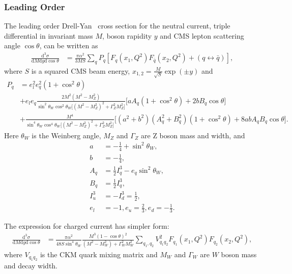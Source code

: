 \documentclass[11pt,a4paper]{article}
\begin{document}
\subsubsection{Leading Order}
The leading order Drell-Yan~\cite{Drell:1970wh,Yamada:1981mw} cross section 
for the neutral current, triple differential in
invariant mass \(M\), boson rapidity \(y\) and CMS
lepton scattering angle \(\cos\theta\), can be written as
\begin{align}
\frac{\mathrm{d}^3\sigma}{\mathrm{d}M\mathrm{d}y\mathrm{d}\cos\theta} &=
  \frac{\pi\alpha^2}{3MS}\sum_{q}P_q
  \left[F_q(x_1,Q^2)F_{\bar{q}}(x_2,Q^2) + (q\leftrightarrow\bar{q})\right],
\end{align}
where \(S\) is a squared CMS beam energy, \(x_{1,2} = \frac{M}{\sqrt{S}}\exp(\pm y)\) and 
\begin{align}
  P_q &=  e_l^2e_q^2(1+\cos^2\theta) \nonumber \\
      &+  e_le_q\frac{2M^2(M^2-M_Z^2)}{\sin^2\theta_W\cos^2\theta_W
          \big[(M^2-M_Z^2)^2+\Gamma_Z^2M_Z^2\big]}
          \big[aA_q(1+\cos^2\theta)+2bB_q\cos\theta\big] \nonumber \\
      &+  \frac{M^4}{\sin^4\theta_W\cos^4\theta_W
          \big[(M^2-M_Z^2)^2+\Gamma_Z^2M_Z^2\big]}
          \big[(a^2+b^2)(A_q^2+B_q^2)(1+\cos^2\theta)+8abA_qB_q\cos\theta\big].
\end{align}
Here \(\theta_W\) is the Weinberg angle, \(M_Z\) and \(\Gamma_Z\) are Z boson mass and 
width, and
\begin{align}
 a & = -\frac{1}{4} + \sin^2\theta_W,  \nonumber \\
 b & = -\frac{1}{4},  \nonumber \\
 A_q & = \frac{1}{2}I_q^3-e_q\sin^2\theta_W, \nonumber \\
 B_q & = \frac{1}{2}I_q^3,  \nonumber \\
 I_u^3 & = -I_d^3 = \frac{1}{2},  \nonumber \\
 e_l & = -1, e_u = \frac{2}{3}, e_d = -\frac{1}{3}.
\end{align}

The expression for charged current has simpler form:
\begin{align}
\frac{\mathrm{d}^3\sigma}{\mathrm{d}M\mathrm{d}y\mathrm{d}\cos\theta} &=
 \frac{\pi\alpha^2}{48S\sin^4\theta_W}
 \frac{M^3(1-\cos\theta)^2}{(M^2-M_W^2)+\Gamma_W^2M_W^2}
 \sum_{q_1,q_2}V_{q_1q_2}^2F_{q_1}(x_1,Q^2)F_{q_2}(x_2,Q^2),
\end{align}
where \(V_{q_1q_2}\) is the CKM quark mixing matrix and \(M_W\) and \(\Gamma_W\)
are \(W\) boson mass and decay width.
\end{document}
